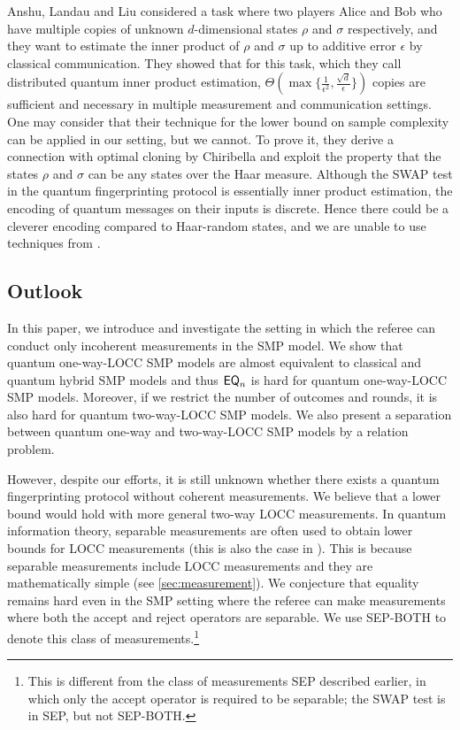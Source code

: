Anshu, Landau and Liu \cite{ALL22} considered a task where two players
Alice and Bob who have multiple copies of unknown $d$-dimensional states $\rho$ and $\sigma$ respectively, and they want to estimate the inner product of $\rho$ and $\sigma$ up to additive error $\epsilon$ by classical communication. They showed that for this task, which they call distributed quantum inner product estimation, $\Theta( \max \{ \frac{1}{\epsilon^2}, \frac{\sqrt{d}}{\epsilon} \})$ copies are sufficient and necessary in multiple measurement and communication settings. One may consider that their technique for the lower bound on sample complexity can be applied in our setting, but we cannot. To prove it, they derive a connection with optimal cloning by Chiribella \cite{Chi10} and exploit the property that the states $\rho$ and $\sigma$ can be any states over the Haar measure. Although the SWAP test in the quantum fingerprinting protocol is essentially inner product estimation, the encoding of quantum messages on their inputs is discrete. Hence there could be a cleverer encoding compared to Haar-random states, and we are unable to use techniques from \cite{ALL22}.

\subsection{Outlook}

In this paper, we introduce and investigate the setting in which the referee can conduct only incoherent measurements in the SMP model. We show that quantum one-way-LOCC SMP models are almost equivalent to classical and quantum hybrid SMP models and thus $\mathsf{EQ}_n$ is hard for quantum one-way-LOCC SMP models. Moreover, if we restrict the number of outcomes and rounds, it is also hard for quantum two-way-LOCC SMP models. We also present a separation between quantum one-way and two-way-LOCC SMP models by a relation problem.

However, despite our efforts, it is still unknown whether there exists a quantum fingerprinting protocol without coherent measurements. We believe that a lower bound would hold with more general two-way LOCC measurements. In quantum information theory, separable measurements are often used to obtain lower bounds for LOCC measurements (this is also the case in \cite{ALL22}). This is because separable measurements include LOCC measurements and they are mathematically simple (see \cref{sec:measurement}). We conjecture that equality remains hard even in the SMP setting where the referee can make measurements where both the accept and reject operators are separable. We use SEP-BOTH to denote this class of measurements.\footnote{This is different from the class of measurements SEP described earlier, in which only the accept operator is required to be separable; the SWAP test is in SEP, but not SEP-BOTH.}

